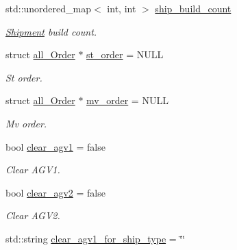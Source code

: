 \begin{DoxyCompactItemize}
std\+::unordered\+\_\+map$<$ int, int $>$ \hyperlink{classBuildClass_a46932efd4c8b2b97d0624a6117b40ee0}{ship\+\_\+build\+\_\+count}
\begin{DoxyCompactList}\small\item\em \hyperlink{structShipment}{Shipment} build count. \end{DoxyCompactList}\item 
\mbox{\label{classBuildClass_afee9ec162b045de467138097c913ab3a}} 
struct \hyperlink{structall__Order}{all\+\_\+\+Order} $\ast$ \hyperlink{classBuildClass_afee9ec162b045de467138097c913ab3a}{st\+\_\+order} = N\+U\+LL
\begin{DoxyCompactList}\small\item\em St order. \end{DoxyCompactList}\item 
\mbox{\label{classBuildClass_a97f473aacf55fc9e2f036df24f14a5ad}} 
struct \hyperlink{structall__Order}{all\+\_\+\+Order} $\ast$ \hyperlink{classBuildClass_a97f473aacf55fc9e2f036df24f14a5ad}{mv\+\_\+order} = N\+U\+LL
\begin{DoxyCompactList}\small\item\em Mv order. \end{DoxyCompactList}\item 
\mbox{\label{classBuildClass_a7a270922ce988fa65df7fd153eb32574}} 
bool \hyperlink{classBuildClass_a7a270922ce988fa65df7fd153eb32574}{clear\+\_\+agv1} = false
\begin{DoxyCompactList}\small\item\em Clear A\+G\+V1. \end{DoxyCompactList}\item 
\mbox{\label{classBuildClass_a152890ffd474645a17cd05a48e25d969}} 
bool \hyperlink{classBuildClass_a152890ffd474645a17cd05a48e25d969}{clear\+\_\+agv2} = false
\begin{DoxyCompactList}\small\item\em Clear A\+G\+V2. \end{DoxyCompactList}\item 
\mbox{\label{classBuildClass_a347a5c88bc6562ea1c3be62cd9bb7ae1}} 
std\+::string \hyperlink{classBuildClass_a347a5c88bc6562ea1c3be62cd9bb7ae1}{clear\+\_\+agv1\+\_\+for\+\_\+ship\+\_\+type} = \char`\"{}\char`\"{}

\end{DoxyCompactItemize}
